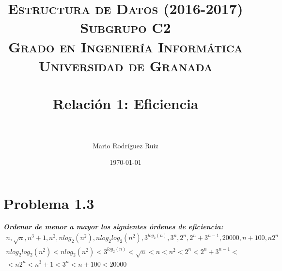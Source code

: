 


\title{	
\normalfont \normalsize 
\textsc{\textbf{Estructura de Datos (2016-2017)} \\ Subgrupo C2 \\ Grado en Ingeniería Informática\\ Universidad de Granada} \\ [25pt] %
\horrule{0.5pt} \\[0.4cm] %
\huge Relación 1: Eficiencia \\ %
\horrule{2pt} \\[0.5cm] %
}

\author{Mario Rodríguez Ruiz} %

\date{\normalsize\today} %




\maketitle %

\newpage %

\tableofcontents %

\newpage

\section{Problema 1.3}
\textbf{\textit{Ordenar de menor a mayor los siguientes órdenes de eficiencia:}}
\begin{gather*}
	n, \sqrt{n}, n^3+1, n^2, nlog_{2}(n^2),nlog_{2}log_{2}(n^2), 3^{log_{2}(n)}, 3^n, 2^n, 2^n+3^{n-1}, 20000, n + 100, n2^n\\
	nlog_{2}log_{2}(n^2) <  nlog_{2}(n^2) < 3^{log_{2}(n)} < \sqrt{n} < n < n^2 < 2^n < 2^n + 3^{n-1} < \\
	< n2^n < n^3 + 1 < 3^n < n + 100 < 20000
\end{gather*}


